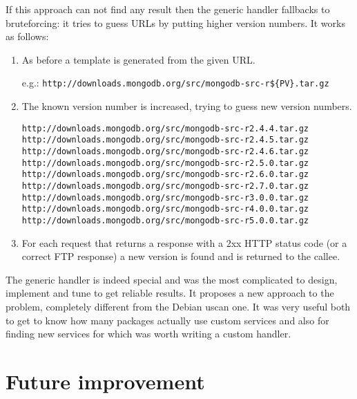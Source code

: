 If this approach can not find any result then the generic handler fallbacks to bruteforcing: it tries to guess URLs by putting higher version numbers. It works as follows:

\begin{enumerate}

\item As before a template is generated from the given URL.

e.g.: \texttt{http://downloads.mongodb.org/src/mongodb-src-r\$\{PV\}.tar.gz}

\item The known version number is increased, trying to guess new version numbers.

\texttt{http://downloads.mongodb.org/src/mongodb-src-r2.4.4.tar.gz} \\
\texttt{http://downloads.mongodb.org/src/mongodb-src-r2.4.5.tar.gz} \\
\texttt{http://downloads.mongodb.org/src/mongodb-src-r2.4.6.tar.gz} \\
\texttt{http://downloads.mongodb.org/src/mongodb-src-r2.5.0.tar.gz} \\
\texttt{http://downloads.mongodb.org/src/mongodb-src-r2.6.0.tar.gz} \\
\texttt{http://downloads.mongodb.org/src/mongodb-src-r2.7.0.tar.gz} \\
\texttt{http://downloads.mongodb.org/src/mongodb-src-r3.0.0.tar.gz} \\
\texttt{http://downloads.mongodb.org/src/mongodb-src-r4.0.0.tar.gz} \\
\texttt{http://downloads.mongodb.org/src/mongodb-src-r5.0.0.tar.gz} \\


\item For each request that returns a response with a 2xx HTTP status code (or a correct FTP response) a new version is found and is returned to the callee.
\end{enumerate}

The generic handler is indeed special and was the most complicated to design, implement and tune to get reliable results. It proposes a new approach to the problem, completely different from the Debian uscan one. It was very useful both to get to know how many packages actually use custom services and also for finding new services for which was worth writing a custom handler.


\section{Future improvement}

